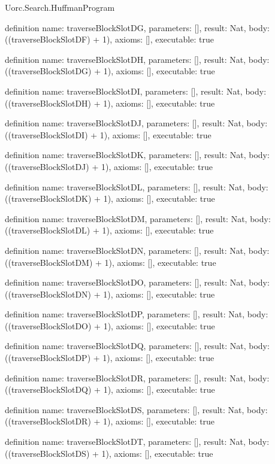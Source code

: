 \begin{lexlean}{Uorc.Search.HuffmanProgram}
\begin{semanticmodule}
definition{
  name: traverseBlockSlotDG,
  parameters: [],
  result: Nat,
  body: ((traverseBlockSlotDF) + 1),
  axioms: [],
  executable: true
}

definition{
  name: traverseBlockSlotDH,
  parameters: [],
  result: Nat,
  body: ((traverseBlockSlotDG) + 1),
  axioms: [],
  executable: true
}

definition{
  name: traverseBlockSlotDI,
  parameters: [],
  result: Nat,
  body: ((traverseBlockSlotDH) + 1),
  axioms: [],
  executable: true
}

definition{
  name: traverseBlockSlotDJ,
  parameters: [],
  result: Nat,
  body: ((traverseBlockSlotDI) + 1),
  axioms: [],
  executable: true
}

definition{
  name: traverseBlockSlotDK,
  parameters: [],
  result: Nat,
  body: ((traverseBlockSlotDJ) + 1),
  axioms: [],
  executable: true
}

definition{
  name: traverseBlockSlotDL,
  parameters: [],
  result: Nat,
  body: ((traverseBlockSlotDK) + 1),
  axioms: [],
  executable: true
}

definition{
  name: traverseBlockSlotDM,
  parameters: [],
  result: Nat,
  body: ((traverseBlockSlotDL) + 1),
  axioms: [],
  executable: true
}

definition{
  name: traverseBlockSlotDN,
  parameters: [],
  result: Nat,
  body: ((traverseBlockSlotDM) + 1),
  axioms: [],
  executable: true
}

definition{
  name: traverseBlockSlotDO,
  parameters: [],
  result: Nat,
  body: ((traverseBlockSlotDN) + 1),
  axioms: [],
  executable: true
}

definition{
  name: traverseBlockSlotDP,
  parameters: [],
  result: Nat,
  body: ((traverseBlockSlotDO) + 1),
  axioms: [],
  executable: true
}

definition{
  name: traverseBlockSlotDQ,
  parameters: [],
  result: Nat,
  body: ((traverseBlockSlotDP) + 1),
  axioms: [],
  executable: true
}

definition{
  name: traverseBlockSlotDR,
  parameters: [],
  result: Nat,
  body: ((traverseBlockSlotDQ) + 1),
  axioms: [],
  executable: true
}

definition{
  name: traverseBlockSlotDS,
  parameters: [],
  result: Nat,
  body: ((traverseBlockSlotDR) + 1),
  axioms: [],
  executable: true
}

definition{
  name: traverseBlockSlotDT,
  parameters: [],
  result: Nat,
  body: ((traverseBlockSlotDS) + 1),
  axioms: [],
  executable: true
}


\end{semanticmodule}
\end{lexlean}
